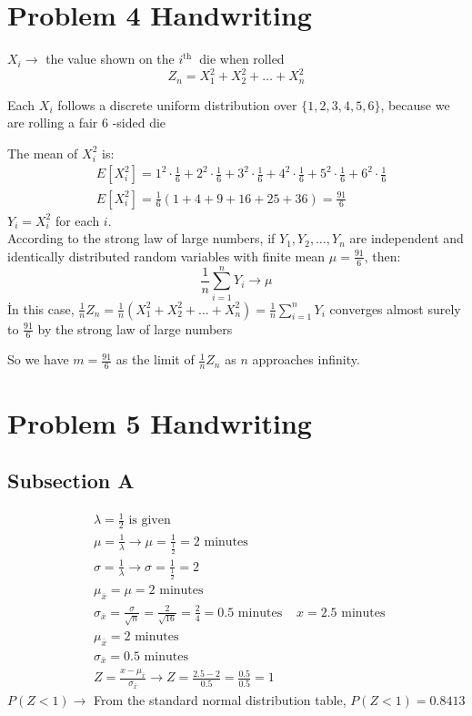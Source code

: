 \documentclass[a4paper,11pt]{article}
\theoremstyle{mytheor}
\begin{document}
\newpage
\section{Problem 4 Handwriting}
$X_i \rightarrow$ the value shown on the $i^{\text {th }}$ die when rolled
$$
Z_n=X_1^2+X_2^2+\ldots+X_n^2
$$

Each $X_i$ follows a discrete uniform distribution over $\{1,2,3,4,5,6\}$, because we are rolling a fair 6 -sided die

The mean of $X_i^2$ is:
$$
\begin{aligned}
& E\left[X_i^2\right]=1^2 \cdot \frac{1}{6}+2^2 \cdot \frac{1}{6}+3^2 \cdot \frac{1}{6}+4^2 \cdot \frac{1}{6}+5^2 \cdot \frac{1}{6}+6^2 \cdot \frac{1}{6} \\
& E\left[X_i^2\right]=\frac{1}{6}(1+4+9+16+25+36)=\frac{91}{6}
\end{aligned}
$$
$Y_i=X_i^2$ for each $i$.\\
According to the strong law of large numbers, if $Y_1, Y_2, \ldots, Y_n$ are independent and identically distributed random variables with finite mean $\mu=\frac{91}{6}$, then:
$$
\frac{1}{n} \sum_{i=1}^n Y_i \rightarrow \mu
$$
İn this case, $\frac{1}{n} Z_n=\frac{1}{n}\left(X_1^2+X_2^2+\ldots+X_n^2\right)=\frac{1}{n} \sum_{i=1}^n Y_i$ converges almost surely to $\frac{91}{6}$ by the strong law of large numbers

So we have $m=\frac{91}{6}$ as the limit of $\frac{1}{n} Z_n$ as $n$ approaches infinity.

\section{Problem 5 Handwriting}
\subsection{Subsection A}
$$
\begin{aligned}
& \lambda=\frac{1}{2} \text { is given } \\
& \mu=\frac{1}{\lambda} \rightarrow \mu=\frac{1}{\frac{1}{2}}=2 \text { minutes }\\
& \sigma=\frac{1}{\lambda} \rightarrow \sigma=\frac{1}{\frac{1}{2}}=2\\    
& \mu_{\bar{x}}=\mu=2 \text { minutes } \\
& \sigma_{\bar{x}}=\frac{\sigma}{\sqrt{n}}=\frac{2}{\sqrt{16}}=\frac{2}{4}=0.5 \text { minutes }
& x=2.5 \text { minutes } \\
& \mu_{\bar{x}}=2 \text { minutes } \\
& \sigma_{\bar{x}}=0.5 \text { minutes }\\
& Z=\frac{x-\mu_{\bar{x}}}{\sigma_{\bar{x}}} \rightarrow Z=\frac{2.5-2}{0.5}=\frac{0.5}{0.5}=1    
\end{aligned}
$$
$P(Z<1) \rightarrow$ From the standard normal distribution table, $P(Z<1)=0.8413$    
\end{document}
